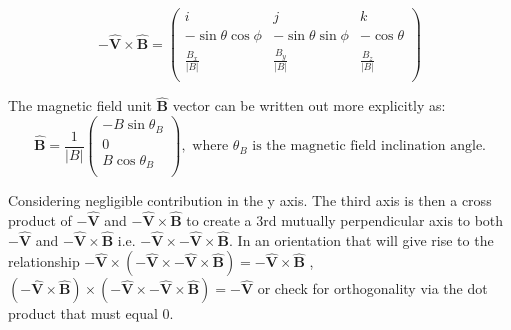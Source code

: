 \documentclass[11pt]{article}
\begin{document}
\begin{equation}
    \mathbf{-\hat{V}}\times \mathbf{\hat{B}} = \left(
    \begin{array}{ccc}
    i & j & k \\ 	
   - \sin\theta \cos\phi & -\sin\theta \sin\phi  & -\cos\theta \\ 
    \frac{ B_x}{\left|B\right|}& \frac{ B_y}{\left|B\right|} &\frac{ B_z}{\left|B\right|}\\
\end{array} 
\right)
\end{equation}

The magnetic field unit $\mathbf{\hat{B}}$ vector can be written out more explicitly as:
\begin{equation}
   \mathbf{\hat{B}}=\frac{1}{\left|B\right|} \left(
    \begin{array}{c}
    -B\sin\theta_B \\ 	
    0\\ 
    B\cos\theta_B \\
\end{array} 
\right),  \mbox{  where $\theta_B$ is the magnetic field inclination angle.}
\end{equation}

Considering negligible contribution in the y axis. The third axis is then a cross product of   $\mathbf{-\hat{V}}$ and $\mathbf{-\hat{V}}\times \mathbf{\hat{B}}$ to create a 3rd mutually perpendicular axis to both $\mathbf{-\hat{V}}$ and $\mathbf{-\hat{V}}\times \mathbf{\hat{B}}$ i.e. $\mathbf{-\hat{V}} \times\mathbf{-\hat{V}}\times \mathbf{\hat{B}}$. In an orientation that will give rise to the relationship $\mathbf{-\hat{V}} \times \left( \mathbf{-\hat{V}} \times\mathbf{-\hat{V}}\times \mathbf{\hat{B}}\right) = \mathbf{-\hat{V}}\times \mathbf{\hat{B}} $ , $\left(\mathbf{-\hat{V}}\times \mathbf{\hat{B}}\right) \times \left( \mathbf{-\hat{V}} \times\mathbf{-\hat{V}}\times \mathbf{\hat{B}}\right) = \mathbf{-\hat{V}}$ or check for orthogonality via the dot product that must equal 0.

\end{document}
